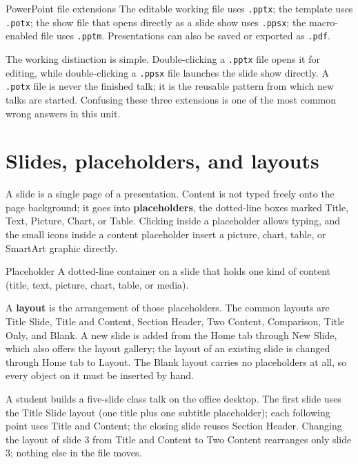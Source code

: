 \begin{definitionbox}{PowerPoint file extensions}
The editable working file uses \texttt{.pptx}; the template uses
\texttt{.potx}; the show file that opens directly as a slide show uses
\texttt{.ppsx}; the macro-enabled file uses \texttt{.pptm}. Presentations can
also be saved or exported as \texttt{.pdf}.
\end{definitionbox}

The working distinction is simple. Double-clicking a \texttt{.pptx} file opens
it for editing, while double-clicking a \texttt{.ppsx} file launches the
slide show directly. A \texttt{.potx} file is never the finished talk; it is
the reusable pattern from which new talks are started. Confusing these three
extensions is one of the most common wrong answers in this unit.

\section{Slides, placeholders, and layouts}
A slide is a single page of a presentation. Content is not typed freely onto
the page background; it goes into \textbf{placeholders}, the dotted-line boxes
marked Title, Text, Picture, Chart, or Table. Clicking inside a placeholder
allows typing, and the small icons inside a content placeholder insert a
picture, chart, table, or SmartArt graphic directly.

\begin{definitionbox}{Placeholder}
A dotted-line container on a slide that holds one kind of content (title,
text, picture, chart, table, or media).
\end{definitionbox}

A \textbf{layout} is the arrangement of those placeholders. The common layouts
are Title Slide, Title and Content, Section Header, Two Content, Comparison,
Title Only, and Blank. A new slide is added from the Home tab through New
Slide, which also offers the layout gallery; the layout of an existing slide
is changed through Home tab to Layout. The Blank layout carries no
placeholders at all, so every object on it must be inserted by hand.

\begin{example}
A student builds a five-slide class talk on the office desktop. The first
slide uses the Title Slide layout (one title plus one subtitle placeholder);
each following point uses Title and Content; the closing slide reuses Section
Header. Changing the layout of slide 3 from Title and Content to Two Content
rearranges only slide 3; nothing else in the file moves.
\end{example}

